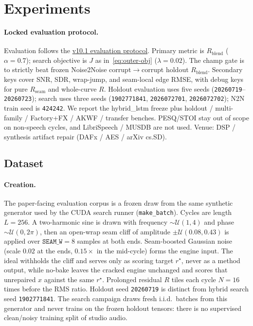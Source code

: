 \section{Experiments}
\label{sec:experiments}

\paragraph{Locked evaluation protocol.}
Evaluation follows the \href{https://github.com/reeldemo/denoise-opt-meta/blob/master/paper/Unsupervised_Wrap-Discontinuity_Repair_in_Wavetable_Synthesis_via_Hybrid_GA-PPO_Meta-Search_v13/EVAL_PROTOCOL.md}{v10.1 evaluation protocol}.
Primary metric is $R_{\mathrm{blend}}$ ($\alpha{=}0.7$); search objective is $J$ as in~\eqref{eq:outer-obj} ($\lambda{=}0.02$).
The champ gate is to strictly beat frozen Noise2Noise corrupt$\to$corrupt holdout $R_{\mathrm{blend}}$.
Secondary keys cover SNR, SDR, wrap-jump, and seam-local edge RMSE, with debug keys for pure $R_{\mathrm{seam}}$ and whole-curve $R$.
Holdout evaluation uses five seeds (\texttt{20260719}--\texttt{20260723}); search uses three seeds (\texttt{1902771841}, \texttt{2026072701}, \texttt{2026072702}); N2N train seed is \texttt{424242}.
We report the hybrid\_lstm freeze plus holdout / multi-family / Factory+FX / AKWF / transfer benches.
PESQ/STOI stay out of scope on non-speech cycles, and LibriSpeech / MUSDB are not used.
Venue: DSP / synthesis artifact repair (DAFx / AES / arXiv cs.SD).

\subsection{Dataset}
\label{sec:dataset}

\paragraph{Creation.}
The paper-facing evaluation corpus is a frozen draw from the same synthetic generator used by the CUDA search runner (\texttt{make\_batch}).
Cycles are length $L{=}256$.
A two-harmonic sine is drawn with frequency $\sim\mathcal{U}(1,4)$ and phase $\sim\mathcal{U}(0,2\pi)$, then an open-wrap seam cliff of amplitude $\pm\mathcal{U}(0.08,0.43)$ is applied over $\texttt{SEAM\_W}{=}8$ samples at both ends.
Seam-boosted Gaussian noise (scale $0.02$ at the ends, $0.15\times$ in the mid-cycle) forms the engine input.
The ideal withholds the cliff and serves only as scoring target $r^{\star}$, never as a method output, while no-bake leaves the cracked engine unchanged and scores that unrepaired $x$ against the same $r^{\star}$.
Prolonged residual $R$ tiles each cycle $N{=}16$ times before the RMS ratio.
Holdout seed \texttt{20260719} is distinct from hybrid search seed \texttt{1902771841}.
The search campaign draws fresh i.i.d.\ batches from this generator and never trains on the frozen holdout tensors: there is no supervised clean/noisy training split of studio audio.

